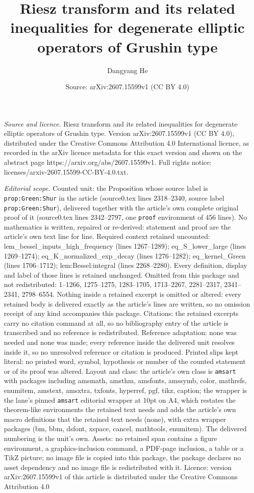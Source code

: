 \documentclass[10pt,a4paper]{amsart}
\title[Riesz transform and its related inequalities for degenerate ]{Riesz transform and its related inequalities for degenerate elliptic operators of Grushin type}
\author{Dangyang He}
\date{Source: arXiv:2607.15599v1 (CC BY 4.0)}
\begin{document}
\maketitle

\noindent\emph{Source and licence.} Riesz transform and its related inequalities for degenerate elliptic operators of Grushin type. Version arXiv:2607.15599v1 (CC BY 4.0), distributed under the Creative Commons Attribution 4.0 International licence, as recorded in the arXiv licence metadata for this exact version and shown on the abstract page https://arxiv.org/abs/2607.15599v1. Full rights notice: licenses/arxiv-2607.15599-CC-BY-4.0.txt.\par\smallskip

\noindent\textit{Editorial scope.} Counted unit: the Proposition whose source label is \texttt{prop:Green:Shur} in the article (source0.tex lines 2318--2340, source label \texttt{prop:Green:Shur}), delivered together with the article's own complete original proof of it (source0.tex lines 2342--2797, one \texttt{proof} environment of 456 lines). No mathematics is written, repaired or re-derived: statement and proof are the article's own text line for line. Required context retained uncounted: lem\_bessel\_inputs\_high\_frequency (lines 1267--1289); eq\_S\_lower\_large (lines 1269--1274); eq\_K\_normalized\_exp\_decay (lines 1276--1282); eq\_kernel\_Green (lines 1706--1712); lem:Bessel:integral (lines 2268--2280). Every definition, display and label of those lines is retained unchanged. Omitted from this package and not redistributed: 1--1266, 1275--1275, 1283--1705, 1713--2267, 2281--2317, 2341--2341, 2798--6554. Nothing inside a retained excerpt is omitted or altered: every retained body is delivered exactly as the article's lines are written, so no omission receipt of any kind accompanies this package. Citations: the retained excerpts carry no citation command at all, so no bibliography entry of the article is transcribed and no reference is redistributed. Reference adaptation: none was needed and none was made; every reference inside the delivered unit resolves inside it, so no unresolved reference or citation is produced. Printed slips kept literal: no printed word, symbol, hypothesis or number of the counted statement or of its proof was altered. Layout and class: the article's own class is \texttt{amsart} with packages including amsmath, amsthm, amsfonts, amssymb, color, mathrsfs, enumitem, amstext, amsxtra, txfonts, hyperref, pgf, tikz, caption; the wrapper is the lane's pinned \texttt{amsart} editorial wrapper at 10pt on A4, which restates the theorem-like environments the retained text needs and adds the article's own macro definitions that the retained text needs (none), with extra wrapper packages (bm, bbm, dsfont, xspace, cancel, mathtools, enumitem). The delivered numbering is the unit's own. Assets: no retained span contains a figure environment, a graphics-inclusion command, a PDF-page inclusion, a table or a TikZ picture; no image file is copied into this package, the package declares no asset dependency and no image file is redistributed with it. Licence: version arXiv:2607.15599v1 of this article is distributed under the Creative Commons Attribution 4.0 
\end{document}
